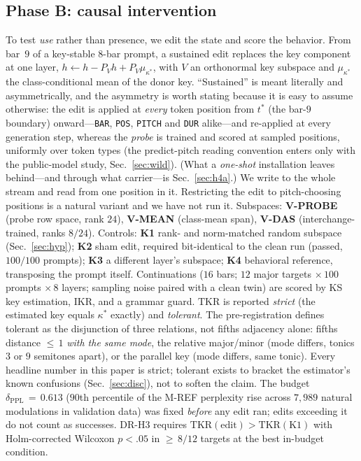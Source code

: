 \documentclass[conference]{IEEEtran}
\newcommand{\tkr}{\mathrm{TKR}}
\newcommand{\ikr}{\mathrm{IKR}}
\newcommand{\ppl}{\delta_{\mathrm{PPL}}}
\begin{document}
\subsection{Phase B: causal intervention}
\label{sec:methodB}
To test \emph{use} rather than presence, we edit the state and score the behavior.
From bar~$9$ of a key-stable $8$-bar prompt, a sustained edit replaces the key
component at one layer, $h \leftarrow h - P_V h + P_V\mu_{\kappa^{*}}$, with $V$ an
orthonormal key subspace and $\mu_{\kappa^{*}}$ the class-conditional mean of the
donor key. ``Sustained'' is meant literally and asymmetrically, and the asymmetry is
worth stating because it is easy to assume otherwise: the edit is applied at
\emph{every} token position from $t^{*}$ (the bar-$9$ boundary) onward---\texttt{BAR},
\texttt{POS}, \texttt{PITCH} and \texttt{DUR} alike---and re-applied at every generation
step, whereas the \emph{probe} is trained and scored at sampled positions, uniformly
over token types (the predict-pitch reading convention enters only with the
public-model study, Sec.~\ref{sec:wild}). (What a \emph{one-shot} installation leaves behind---and through what
carrier---is Sec.~\ref{sec:h4a}.) We write to the whole stream and read from
one position in it. Restricting the edit to pitch-choosing positions is a natural
variant and we have not run it. Subspaces: \textbf{V-PROBE} (probe row space, rank $24$),
\textbf{V-MEAN} (class-mean span), \textbf{V-DAS} (interchange-trained, ranks
$8/24$). Controls: \textbf{K1} rank- and norm-matched random subspace
(Sec.~\ref{sec:hyp}); \textbf{K2} sham
edit, required bit-identical to the clean run (passed, $100/100$ prompts);
\textbf{K3} a different layer's subspace; \textbf{K4} behavioral reference,
transposing the prompt itself. Continuations ($16$ bars; $12$ major targets
$\times\,100$ prompts $\times\,8$ layers; sampling noise paired with a clean twin)
are scored by KS key estimation, $\ikr$, and a grammar guard. $\tkr$ is reported
\emph{strict} (the estimated key equals $\kappa^{*}$ exactly) and \emph{tolerant}. The
pre-registration defines tolerant as the disjunction of three relations, not fifths
adjacency alone: fifths distance ${\leq}\,1$ \emph{with the same mode}, the relative
major/minor (mode differs, tonics $3$ or $9$ semitones apart), or the parallel key
(mode differs, same tonic). Every headline number in this paper is strict; tolerant
exists to bracket the estimator's known confusions (Sec.~\ref{sec:disc}), not to soften
the claim. The budget $\ppl\,{=}\,0.613$ ($90$th percentile of
the M-REF perplexity rise across $7{,}989$ natural modulations in validation data)
was fixed \emph{before} any edit ran; edits exceeding it do not count as successes.
DR-H3 requires $\tkr(\text{edit})>\tkr(\text{K1})$ with Holm-corrected Wilcoxon
$p<.05$ in ${\geq}\,8/12$ targets at the best in-budget condition.
\end{document}
